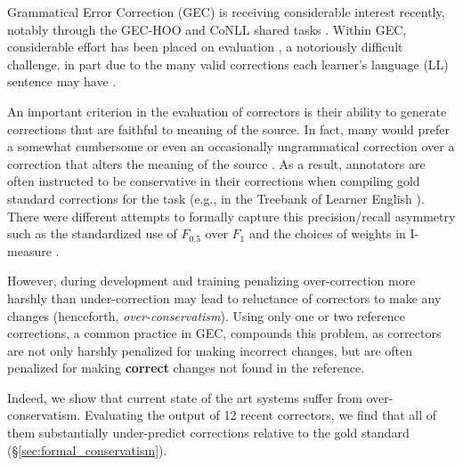 \documentclass[letterpaper, 11pt]{article}
\begin{document}
%
Grammatical Error Correction (GEC) is receiving considerable
interest recently, notably through the GEC-HOO \cite{dale2011helping,dale2012hoo} and
CoNLL shared tasks \cite{kao2013conll,ng2014conll}.
Within GEC, considerable effort has been placed on evaluation
\cite{tetreault2008native,madnani2011they,felice2015towards,napoles2015ground},
a notoriously difficult challenge, in part due to the many valid corrections each learner's language (LL) sentence may
have \cite{chodorow2012problems}.

An important criterion in the evaluation of correctors
is their ability to generate corrections that are faithful to meaning of the source.
In fact, many would prefer a somewhat cumbersome or even an occasionally ungrammatical
correction over a correction that alters the meaning of the source \cite{brockett2006correcting}.
As a result, 
annotators are often instructed to be conservative in their corrections
when compiling gold standard corrections for the task
(e.g., in the Treebank of Learner English \cite{nicholls2003cambridge}).
There were different attempts to formally capture this precision/recall asymmetry such as the standardized use of $F_{0.5}$ over $F_{1}$ \cite{dahlmeier2012better} and the choices of weights in I-measure \cite{felice2015towards}.

However, during development and training penalizing over-correction more harshly than under-correction may lead to reluctance of correctors to
make any changes (henceforth, {\it over-conservatism}).
Using only one or two reference corrections, a common practice in GEC,
compounds this problem, as correctors are not only harshly penalized for making incorrect changes,
but are often penalized for making {\bf correct} changes not found in the reference.

Indeed, we show that current state of the art systems suffer from over-conservatism.
Evaluating the output of 12 recent correctors, we find that all of them
substantially under-predict corrections relative to the gold standard (\S \ref{sec:formal_conservatism}).
\end{document}
